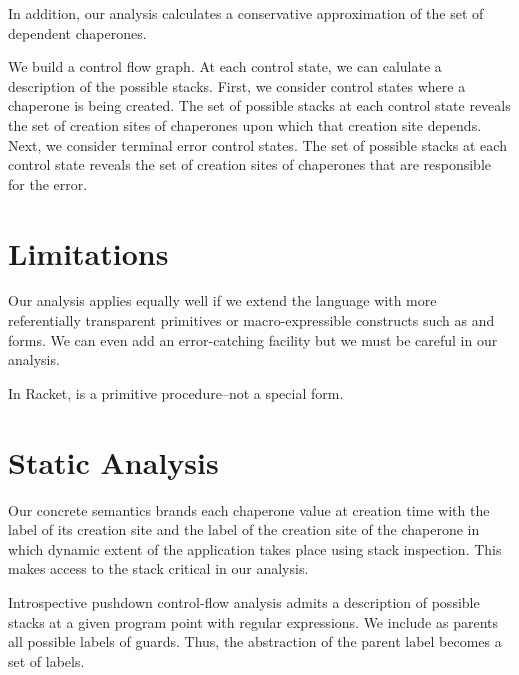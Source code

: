 \documentclass{sigplanconf}
\begin{document}
In addition, our analysis calculates a conservative approximation of the set of dependent chaperones.

We build a control flow graph.
At each control state, we can calulate a description of the possible stacks.
First, we consider control states where a chaperone is being created.
The set of possible stacks at each control state reveals the set of creation sites of chaperones upon which that creation site depends.
Next, we consider terminal error control states.
The set of possible stacks at each control state reveals the set of creation sites of chaperones that are responsible for the error.

\section{Limitations}

Our analysis applies equally well if we extend the language with more referentially transparent primitives or macro-expressible constructs such as  and  forms.
We can even add an error-catching facility but we must be careful in our analysis.

In Racket,  is a primitive procedure--not a special form.


\section{Static Analysis}

Our concrete semantics brands each chaperone value at creation time with the label of its creation site and the label of the creation site of the chaperone in which dynamic extent of the application takes place using stack inspection. This makes access to the stack critical in our analysis.

Introspective pushdown control-flow analysis admits a description of possible stacks at a given program point with regular expressions. We include as parents all possible labels of guards. Thus, the abstraction of the parent label becomes a set of labels.


\end{document}
